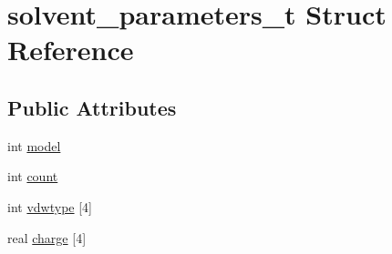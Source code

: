 \hypertarget{structsolvent__parameters__t}{\section{solvent\-\_\-parameters\-\_\-t \-Struct \-Reference}
\label{structsolvent__parameters__t}
}
\subsection*{\-Public \-Attributes}
\begin{DoxyCompactItemize}
\item 
int \hyperlink{structsolvent__parameters__t_a5ecaff4a91a11e05c4f37e5593be265f}{model}
\item 
int \hyperlink{structsolvent__parameters__t_a24605e7bd7970c2e70fe1841bc688f93}{count}
\item 
int \hyperlink{structsolvent__parameters__t_acf48f9e8402d3137ba186df95ce6f257}{vdwtype} \mbox{[}4\mbox{]}
\item 
real \hyperlink{structsolvent__parameters__t_abad319d772b18384f1bfc6ef1daf505e}{charge} \mbox{[}4\mbox{]}
\end{DoxyCompactItemize}


